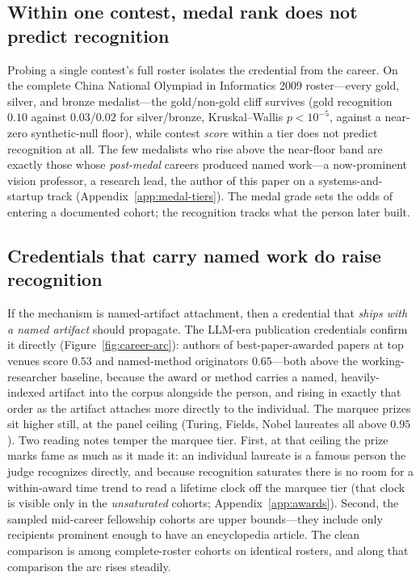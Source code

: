 \documentclass[11pt]{article}
\begin{document}
\subsection{Within one contest, medal rank does not predict recognition}
\label{sec:results-tianshou}

Probing a single contest's full roster isolates the credential from the career. On the complete China National Olympiad in Informatics 2009 roster---every gold, silver, and bronze medalist---the gold/non-gold cliff survives (gold recognition $0.10$ against $0.03$/$0.02$ for silver/bronze, Kruskal--Wallis $p<10^{-5}$, against a near-zero synthetic-null floor), while contest \emph{score} within a tier does not predict recognition at all. The few medalists who rise above the near-floor band are exactly those whose \emph{post-medal} careers produced named work---a now-prominent vision professor, a research lead, the author of this paper on a systems-and-startup track (Appendix~\ref{app:medal-tiers}). The medal grade sets the odds of entering a documented cohort; the recognition tracks what the person later built.

\subsection{Credentials that carry named work do raise recognition}
\label{sec:results-awards}

If the mechanism is named-artifact attachment, then a credential that \emph{ships with a named artifact} should propagate. The LLM-era publication credentials confirm it directly (Figure~\ref{fig:career-arc}): authors of best-paper-awarded papers at top venues score $0.53$ and named-method originators $0.65$---both above the working-researcher baseline, because the award or method carries a named, heavily-indexed artifact into the corpus alongside the person, and rising in exactly that order as the artifact attaches more directly to the individual. The marquee prizes sit higher still, at the panel ceiling (Turing, Fields, Nobel laureates all above $0.95$). Two reading notes temper the marquee tier. First, at that ceiling the prize marks fame as much as it made it: an individual laureate is a famous person the judge recognizes directly, and because recognition saturates there is no room for a within-award time trend to read a lifetime clock off the marquee tier (that clock is visible only in the \emph{unsaturated} cohorts; Appendix~\ref{app:awards}). Second, the sampled mid-career fellowship cohorts are upper bounds---they include only recipients prominent enough to have an encyclopedia article. The clean comparison is among complete-roster cohorts on identical rosters, and along that comparison the arc rises steadily.
\end{document}

